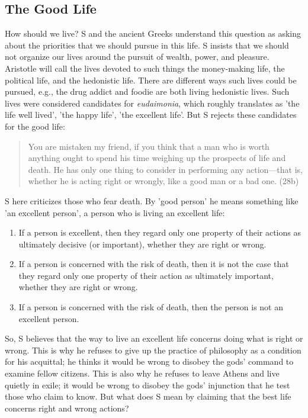 \documentclass[oneside]{article}
\begin{document}
\subsection*{The Good Life}

How should we live? S and the ancient Greeks understand this question as asking about the priorities that we should pursue in this life. S insists that we should not organize our lives around the pursuit of wealth, power, and pleasure. Aristotle will call the lives devoted to such things the money-making life, the political life, and the hedonistic life. There are different ways such lives could be pursued, e.g., the drug addict and foodie are both living hedonistic lives. Such lives were considered candidates for \emph{eudaimonia}, which roughly translates as 'the life well lived', 'the happy life', 'the excellent life'. But S rejects these candidates for the good life: 

\begin{quote}
You are mistaken my friend, if you think that a man who is worth anything ought to spend his time weighing up the prospects of life and death. He has only one thing to consider in performing any action---that is, whether he is acting right or wrongly, like a good man or a bad one. (28b)
\end{quote}
S here criticizes those who fear death. By 'good person' he means something like 'an excellent person', a person who is living an excellent life: 
\begin{enumerate}
\item If a person is excellent, then they regard only one property of their actions as ultimately decisive (or important), whether they are right or wrong.
\item If a person is concerned with the risk of death, then it is not the case that they regard only one property of their action as ultimately important, whether they are right or wrong.
\item If a person is concerned with the risk of death, then the person is not an excellent person.
\end{enumerate}
So, S believes that the way to live an excellent life concerns doing what is right or wrong. This is why he refuses to give up the practice of philosophy as a condition for his acquittal; he thinks it would be wrong to disobey the gods' command to examine  fellow citizens. This is also why he refuses to leave Athens and live quietly in exile; it would be wrong to disobey the gods' injunction that he test those who claim to know. But what does S mean by claiming that the best life concerns right and wrong actions?
\end{document}
